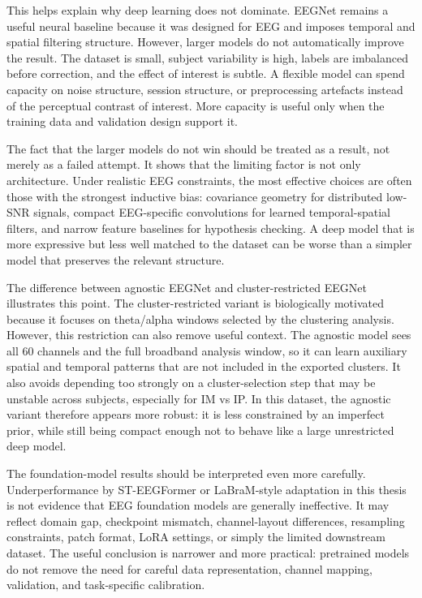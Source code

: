 \documentclass[11pt,a4paper,chapterprefix=false,parskip=false]{scrreprt}
\begin{document}
This helps explain why deep learning does not dominate. EEGNet remains a useful neural baseline because it was designed for EEG and imposes temporal and spatial filtering structure. However, larger models do not automatically improve the result. The dataset is small, subject variability is high, labels are imbalanced before correction, and the effect of interest is subtle. A flexible model can spend capacity on noise structure, session structure, or preprocessing artefacts instead of the perceptual contrast of interest. More capacity is useful only when the training data and validation design support it.

The fact that the larger models do not win should be treated as a result, not merely as a failed attempt. It shows that the limiting factor is not only architecture. Under realistic EEG constraints, the most effective choices are often those with the strongest inductive bias: covariance geometry for distributed low-SNR signals, compact EEG-specific convolutions for learned temporal-spatial filters, and narrow feature baselines for hypothesis checking. A deep model that is more expressive but less well matched to the dataset can be worse than a simpler model that preserves the relevant structure.

The difference between agnostic EEGNet and cluster-restricted EEGNet illustrates this point. The cluster-restricted variant is biologically motivated because it focuses on theta/alpha windows selected by the clustering analysis. However, this restriction can also remove useful context. The agnostic model sees all 60 channels and the full broadband analysis window, so it can learn auxiliary spatial and temporal patterns that are not included in the exported clusters. It also avoids depending too strongly on a cluster-selection step that may be unstable across subjects, especially for IM vs IP. In this dataset, the agnostic variant therefore appears more robust: it is less constrained by an imperfect prior, while still being compact enough not to behave like a large unrestricted deep model.

The foundation-model results should be interpreted even more carefully. Underperformance by ST-EEGFormer or LaBraM-style adaptation in this thesis is not evidence that EEG foundation models are generally ineffective. It may reflect domain gap, checkpoint mismatch, channel-layout differences, resampling constraints, patch format, LoRA settings, or simply the limited downstream dataset. The useful conclusion is narrower and more practical: pretrained models do not remove the need for careful data representation, channel mapping, validation, and task-specific calibration.
\end{document}

